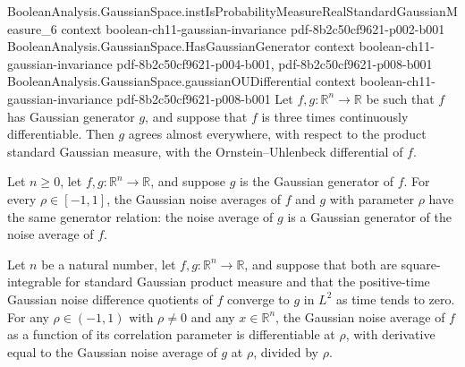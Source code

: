 \begin{theorem}
\proofstep
  {BooleanAnalysis.GaussianSpace.instIsProbabilityMeasureRealStandardGaussianMeasure_6}
  {context}
  {boolean-ch11-gaussian-invariance}
  {pdf-8b2c50cf9621-p002-b001}
\proofstep
  {BooleanAnalysis.GaussianSpace.HasGaussianGenerator}
  {context}
  {boolean-ch11-gaussian-invariance}
  {pdf-8b2c50cf9621-p004-b001,
    pdf-8b2c50cf9621-p008-b001}
\proofstep
  {BooleanAnalysis.GaussianSpace.gaussianOUDifferential}
  {context}
  {boolean-ch11-gaussian-invariance}
  {pdf-8b2c50cf9621-p008-b001}
Let $f,g:\mathbb R^n\to\mathbb R$ be such that $f$ has Gaussian generator $g$, and
suppose that $f$ is three times continuously differentiable. Then $g$ agrees almost
everywhere, with respect to the product standard Gaussian measure, with the
Ornstein–Uhlenbeck differential of $f$.
\end{theorem}

\begin{theorem}
\label{BooleanAnalysis.GaussianSpace.gaussianGenerator_noise}
\leanok
{}
Let $n\ge0$, let $f,g:\mathbb R^n\to\mathbb R$, and suppose $g$ is the Gaussian
generator of $f$. For every $\rho\in[-1,1]$, the Gaussian noise averages of $f$ and $g$
with parameter $\rho$ have the same generator relation: the noise average of $g$ is a
Gaussian generator of the noise average of $f$.
\end{theorem}

\begin{theorem}
\label{BooleanAnalysis.GaussianSpace.hasDerivAt_gaussianNoise}
\leanok
{}
Let $n$ be a natural number, let $f,g:\mathbb R^n\to\mathbb R$, and suppose that both
are square-integrable for standard Gaussian product measure and that the positive-time
Gaussian noise difference quotients of $f$ converge to $g$ in $L^2$ as time tends to
zero. For any $\rho\in(-1,1)$ with $\rho\ne0$ and any $x\in\mathbb R^n$, the Gaussian
noise average of $f$ as a function of its correlation parameter is differentiable at
$\rho$, with derivative equal to the Gaussian noise average of $g$ at $\rho$, divided by
$\rho$.
\end{theorem}

